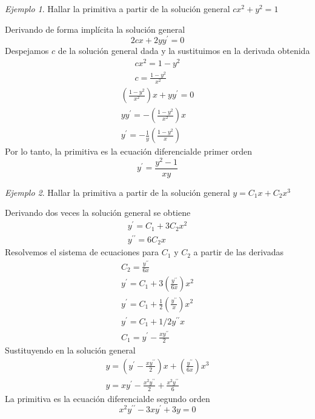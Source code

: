 \documentclass[12pt]{article} %
\theoremstyle{remark} %
\newtheorem{ejemplo}{Ejemplo}[section]
\newcommand{\ed}{ecuación diferencial}
\begin{document}
\begin{ejemplo}
Hallar la primitiva a partir de la solución general $cx^2 + y^2 = 1$

Derivando de forma implícita la solución general \[ 2cx + 2yy^{\prime} = 0 \]
Despejamos $c$ de la solución general dada y la sustituimos en la derivada obtenida
\begin{gather*}
  cx^2 = 1 - y^2\\
  c = \frac{1 - y^2}{x^2}
\end{gather*}
\begin{gather*}
  \left( \frac{1 - y^2}{x^2} \right) x + yy^{\prime} = 0\\[0.5em]
  yy^{\prime} = - \left( \frac{1 - y^2}{x^2} \right) x\\[0.5em]
  y^{\prime} = - \frac{1}{y} \left( \frac{1 - y^2}{x} \right)
\end{gather*}
Por lo tanto, la primitiva es la \ed de primer orden \[ y^{\prime} = \frac{y^2 - 1}{xy} \]
\end{ejemplo}
\begin{ejemplo}
  Hallar la primitiva a partir de la solución general $y = C_1x + C_2x^3$

  Derivando dos veces la solución general se obtiene
  \begin{gather*}
    y^{\prime} = C_1 + 3C_2x^2\\[0.5em]
    y^{\prime \prime} = 6C_2x
  \end{gather*}
  Resolvemos el sistema de ecuaciones para $C_1$ y $C_2$ a partir de las derivadas
  \begin{gather*}
    C_2 = \frac{y^{\prime \prime}}{6x}\\[0.5em]
    y^{\prime} = C_1 + 3 \left( \frac{y^{\prime \prime}}{6x} \right) x^2\\[0.5em]
    y^{\prime} = C_1 + \frac{1}{2} \left( \frac{y^{\prime \prime}}{x} \right) x^2\\[0.5em]
    y^{\prime} = C_1 + 1/2 y^{\prime \prime} x\\[0.5em]
    C_1 = y^{\prime} - \frac{x y^{\prime \prime}}{2}
  \end{gather*}
  Sustituyendo en la solución general
  \begin{gather*}
    y = \left( y^{\prime} - \frac{x y^{\prime \prime}}{2} \right) x + \left( \frac{y^{\prime \prime}}{6x} \right) x^3\\[1em]
    y = xy^{\prime} - \frac{x^2y^{\prime \prime}}{2} + \frac{x^2y^{\prime \prime}}{6}
  \end{gather*}
  La primitiva es la \ed de segundo orden \[ x^2y^{\prime \prime} - 3xy^{\prime} + 3y = 0 \]
\end{ejemplo}
\end{document}
